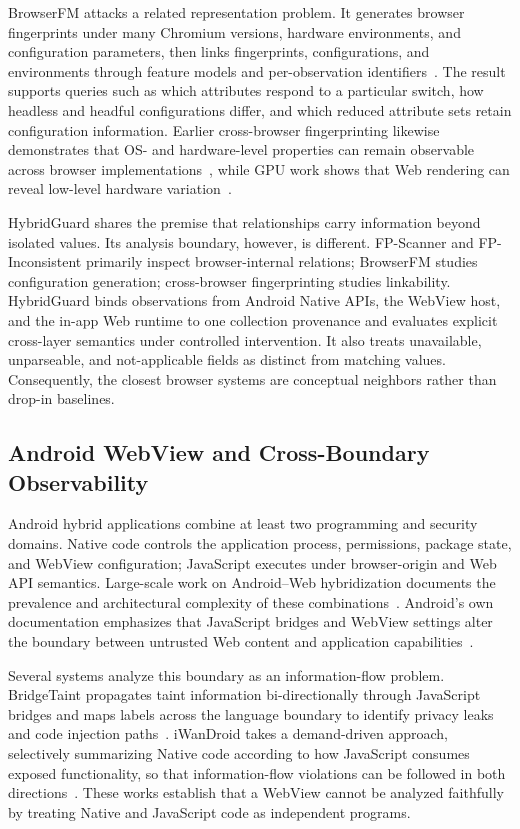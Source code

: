 BrowserFM attacks a related representation problem. It generates browser fingerprints under many Chromium versions, hardware environments, and configuration parameters, then links fingerprints, configurations, and environments through feature models and per-observation identifiers~\cite{huyghe2025browserfm}. The result supports queries such as which attributes respond to a particular switch, how headless and headful configurations differ, and which reduced attribute sets retain configuration information. Earlier cross-browser fingerprinting likewise demonstrates that OS- and hardware-level properties can remain observable across browser implementations~\cite{cao2017crossbrowser}, while GPU work shows that Web rendering can reveal low-level hardware variation~\cite{laor2022drawnapart}.

HybridGuard shares the premise that relationships carry information beyond isolated values. Its analysis boundary, however, is different. FP-Scanner and FP-Inconsistent primarily inspect browser-internal relations; BrowserFM studies configuration generation; cross-browser fingerprinting studies linkability. HybridGuard binds observations from Android Native APIs, the WebView host, and the in-app Web runtime to one collection provenance and evaluates explicit cross-layer semantics under controlled intervention. It also treats unavailable, unparseable, and not-applicable fields as distinct from matching values. Consequently, the closest browser systems are conceptual neighbors rather than drop-in baselines.

\subsection{Android WebView and Cross-Boundary Observability}

Android hybrid applications combine at least two programming and security domains. Native code controls the application process, permissions, package state, and WebView configuration; JavaScript executes under browser-origin and Web API semantics. Large-scale work on Android--Web hybridization documents the prevalence and architectural complexity of these combinations~\cite{tiwari2020hybridization}. Android's own documentation emphasizes that JavaScript bridges and WebView settings alter the boundary between untrusted Web content and application capabilities~\cite{android2026nativebridges,android2026webview,android2026websettings}.

Several systems analyze this boundary as an information-flow problem. BridgeTaint propagates taint information bi-directionally through JavaScript bridges and maps labels across the language boundary to identify privacy leaks and code injection paths~\cite{bai2019bridgetaint}. iWanDroid takes a demand-driven approach, selectively summarizing Native code according to how JavaScript consumes exposed functionality, so that information-flow violations can be followed in both directions~\cite{tiwari2023demand}. These works establish that a WebView cannot be analyzed faithfully by treating Native and JavaScript code as independent programs.

